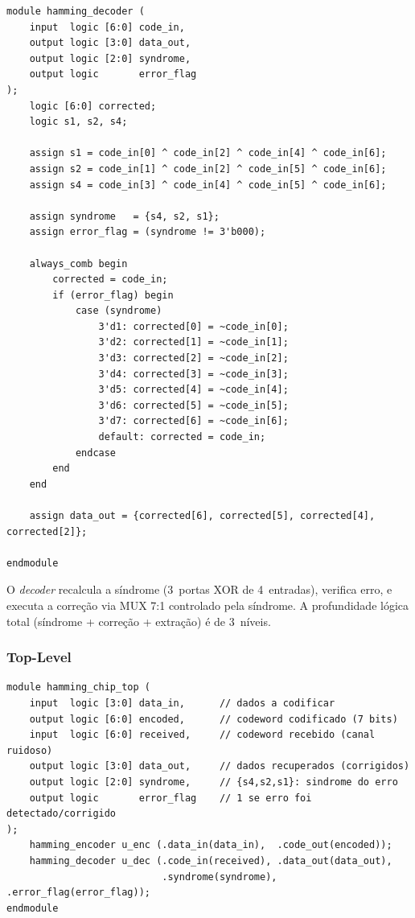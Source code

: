 \documentclass[12pt,a4paper]{article}
\begin{document}
\begin{lstlisting}[style=svstyle,caption={hamming\_decoder.sv --- Decodificador / Corretor combinacional 7$\to$4 bits},label=lst:decoder]
module hamming_decoder (
    input  logic [6:0] code_in,
    output logic [3:0] data_out,
    output logic [2:0] syndrome,
    output logic       error_flag
);
    logic [6:0] corrected;
    logic s1, s2, s4;

    assign s1 = code_in[0] ^ code_in[2] ^ code_in[4] ^ code_in[6];
    assign s2 = code_in[1] ^ code_in[2] ^ code_in[5] ^ code_in[6];
    assign s4 = code_in[3] ^ code_in[4] ^ code_in[5] ^ code_in[6];

    assign syndrome   = {s4, s2, s1};
    assign error_flag = (syndrome != 3'b000);

    always_comb begin
        corrected = code_in;
        if (error_flag) begin
            case (syndrome)
                3'd1: corrected[0] = ~code_in[0];
                3'd2: corrected[1] = ~code_in[1];
                3'd3: corrected[2] = ~code_in[2];
                3'd4: corrected[3] = ~code_in[3];
                3'd5: corrected[4] = ~code_in[4];
                3'd6: corrected[5] = ~code_in[5];
                3'd7: corrected[6] = ~code_in[6];
                default: corrected = code_in;
            endcase
        end
    end

    assign data_out = {corrected[6], corrected[5], corrected[4], corrected[2]};

endmodule
\end{lstlisting}

O \textit{decoder} recalcula a síndrome (3~portas XOR de 4~entradas), verifica erro, e executa a correção via MUX 7:1 controlado pela síndrome. A profundidade lógica total (síndrome + correção + extração) é de 3~níveis.

\subsubsection{Top-Level}

\begin{lstlisting}[style=svstyle,caption={hamming\_chip\_top.sv --- Integração encoder/decoder},label=lst:top]
module hamming_chip_top (
    input  logic [3:0] data_in,      // dados a codificar
    output logic [6:0] encoded,      // codeword codificado (7 bits)
    input  logic [6:0] received,     // codeword recebido (canal ruidoso)
    output logic [3:0] data_out,     // dados recuperados (corrigidos)
    output logic [2:0] syndrome,     // {s4,s2,s1}: sindrome do erro
    output logic       error_flag    // 1 se erro foi detectado/corrigido
);
    hamming_encoder u_enc (.data_in(data_in),  .code_out(encoded));
    hamming_decoder u_dec (.code_in(received), .data_out(data_out),
                           .syndrome(syndrome), .error_flag(error_flag));
endmodule
\end{lstlisting}
\end{document}
